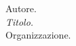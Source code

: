 \begin{thebibliography}{12}
	 Autore. \\
	{\em Titolo.} \\
	{Organizzazione.}
\end{thebibliography}
